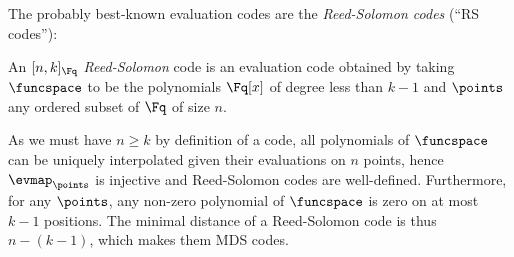 The probably best-known evaluation codes are the \emph{Reed-Solomon codes} (``RS codes''):

\begin{defi}
An $[n,k]_{\Fq}$ \emph{Reed-Solomon} code is an evaluation code obtained by taking $\funcspace$ to be the polynomials $\Fq[x]$
of degree less than $k-1$ and $\points$ any ordered subset of $\Fq$ of size $n$. 
\end{defi}

As we must have $n \geq k$ by definition of a code, all polynomials of $\funcspace$
can be uniquely interpolated given their evaluations on $n$ points, hence $\evmap_\points$ is injective and Reed-Solomon codes are well-defined.
Furthermore, for any $\points$, any non-zero polynomial of $\funcspace$ is zero on at most $k - 1$ positions. The minimal distance of a Reed-Solomon code is thus $n - (k - 1)$, which makes them MDS codes.
